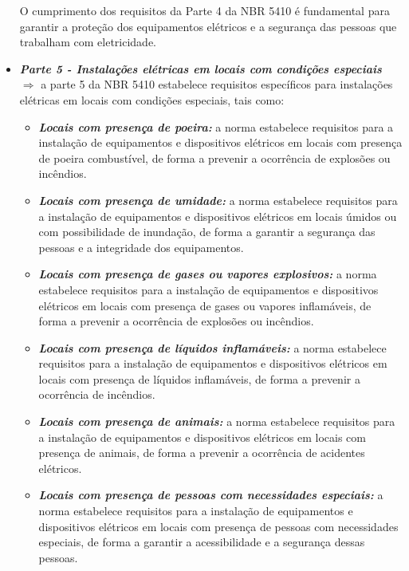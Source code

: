 \documentclass[a4paper, 12pt, onecolumn,singlespacing]{article}
\begin{document}
\begin{itemize}
			
			O cumprimento dos requisitos da Parte 4 da NBR 5410 é fundamental para garantir a proteção dos equipamentos elétricos e a segurança das pessoas que trabalham com eletricidade.
			
			\item \textbf{\textit{Parte 5 - Instalações elétricas em locais com condições especiais $\Rightarrow$ }}a parte 5 da NBR 5410 estabelece requisitos específicos para instalações elétricas em locais com condições especiais, tais como:
			
			\begin{itemize}
				\item \textbf{\textit{Locais com presença de poeira:}} a norma estabelece requisitos para a instalação de equipamentos e dispositivos elétricos em locais com presença de poeira combustível, de forma a prevenir a ocorrência de explosões ou incêndios.
				
				\item \textbf{\textit{Locais com presença de umidade:}} a norma estabelece requisitos para a instalação de equipamentos e dispositivos elétricos em locais úmidos ou com possibilidade de inundação, de forma a garantir a segurança das pessoas e a integridade dos equipamentos.
				
				\item \textbf{\textit{Locais com presença de gases ou vapores explosivos:}} a norma estabelece requisitos para a instalação de equipamentos e dispositivos elétricos em locais com presença de gases ou vapores inflamáveis, de forma a prevenir a ocorrência de explosões ou incêndios.
				
				\item \textbf{\textit{Locais com presença de líquidos inflamáveis:}} a norma estabelece requisitos para a instalação de equipamentos e dispositivos elétricos em locais com presença de líquidos inflamáveis, de forma a prevenir a ocorrência de incêndios.
				
				\item \textbf{\textit{Locais com presença de animais:}} a norma estabelece requisitos para a instalação de equipamentos e dispositivos elétricos em locais com presença de animais, de forma a prevenir a ocorrência de acidentes elétricos.
				
				\item \textbf{\textit{Locais com presença de pessoas com necessidades especiais:}} a norma estabelece requisitos para a instalação de equipamentos e dispositivos elétricos em locais com presença de pessoas com necessidades especiais, de forma a garantir a acessibilidade e a segurança dessas pessoas.
			\end{itemize}
			

\end{itemize}
\end{document}
